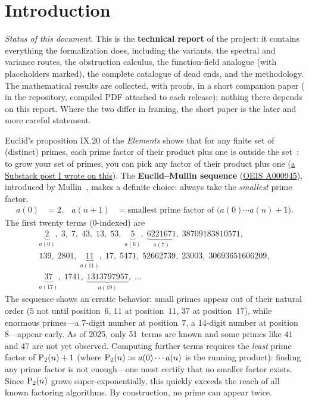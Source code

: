 \section{Introduction}
\label{sec:intro}

\noindent\emph{Status of this document.}  This is the \textbf{technical
report} of the project: it contains everything the formalization does,
including the variants, the spectral and variance routes, the obstruction
calculus, the function-field analogue (with placeholders marked), the
complete catalogue of dead ends, and the methodology.  The mathematical
results are collected, with proofs, in a short companion paper
( in the repository, compiled PDF attached to each release); nothing there depends on
this report.  Where the two differ in framing, the short paper is the
later and more careful statement.


Euclid's proposition IX.20 of the \emph{Elements} shows that for any
finite set of (distinct) primes, each prime factor of their product plus one is outside the
set~\cite{Hardy2009}: to grow your set of primes, you can pick any factor of their product plus one
(\href{https://open.substack.com/pub/marcellop71/p/a-subtle-misreading-of-euclid?utm_campaign=post-expanded-share&utm_medium=web}{a Substack post I wrote on this}).
The \textbf{Euclid--Mullin sequence} (\href{https://oeis.org/A000945}{OEIS A000945}), introduced by Mullin~\cite{Mullin1963}, makes a
definite choice: always take the \emph{smallest} prime factor.
\begin{align}
  a(0) &= 2, &
  a(n+1) &= \text{smallest prime factor of } \bigl(a(0) \cdots a(n) + 1\bigr).
  \label{eq:em-def}
\end{align}
The first twenty terms (0-indexed) are
\begin{gather*}
  \underbrace{2}_{a(0)},\;
  3,\; 7,\; 43,\; 13,\; 53,\;
  \underbrace{5}_{a(6)},\;
  \underbrace{6221671}_{a(7)},\;
  38709183810571, \\
  139,\; 2801,\;
  \underbrace{11}_{a(11)},\;
  17,\; 5471,\; 52662739,\; 23003,\;
  30693651606209, \\
  \underbrace{37}_{a(17)},\;
  1741,\;
  \underbrace{1313797957}_{a(19)},\; \ldots
\end{gather*}
The sequence shows an erratic behavior: small primes appear out of their
natural order ($5$ not until position~$6$, $11$ at position~$11$,
$37$ at position~$17$), while enormous primes---a 7-digit number at
position~$7$, a 14-digit number at position~$8$---appear early.  As of
2025, only 51~terms are known and some primes like $41$ and $47$ are
not yet observed.  Computing further terms requires the \emph{least}
prime factor of $\mathrm{P}_{2}(n)+1$ (where $\mathrm{P}_{2}(n) \coloneqq a(0)\cdots a(n)$
is the running product): finding any prime factor is not
enough---one must certify that no smaller factor exists.  Since
$\mathrm{P}_{2}(n)$ grows super-exponentially, this quickly exceeds the reach
of all known factoring algorithms.  By construction, no prime can
appear twice.

